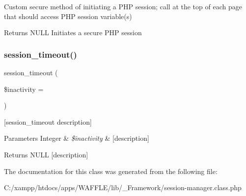 Custom secure method of initiating a P\+HP session; call at the top of each page that should access P\+HP session variable(s)

\begin{DoxyReturn}{Returns}
N\+U\+LL Initiates a secure P\+HP session 
\end{DoxyReturn}
\mbox{\label{class_w_a_f_f_l_e_1_1_controllers_1_1_session_manager_a0699e69686fe46ec84a3c0b680080414}} 
\subsubsection{\texorpdfstring{session\+\_\+timeout()}{session\_timeout()}}
{\footnotesize\ttfamily session\+\_\+timeout (\begin{DoxyParamCaption}\item[{}]{\$inactivity = {} }\end{DoxyParamCaption})}

\mbox{[}session\+\_\+timeout description\mbox{]}


\begin{DoxyParams}[1]{Parameters}
Integer & {\em \$inactivity} & \mbox{[}description\mbox{]} \\
\hline
\end{DoxyParams}
\begin{DoxyReturn}{Returns}
N\+U\+LL \mbox{[}description\mbox{]} 
\end{DoxyReturn}


The documentation for this class was generated from the following file\+:\begin{DoxyCompactItemize}
\item 
C\+:/xampp/htdocs/apps/\+W\+A\+F\+F\+L\+E/lib/\+\_\+\+Framework/session-\/manager.\+class.\+php\end{DoxyCompactItemize}

